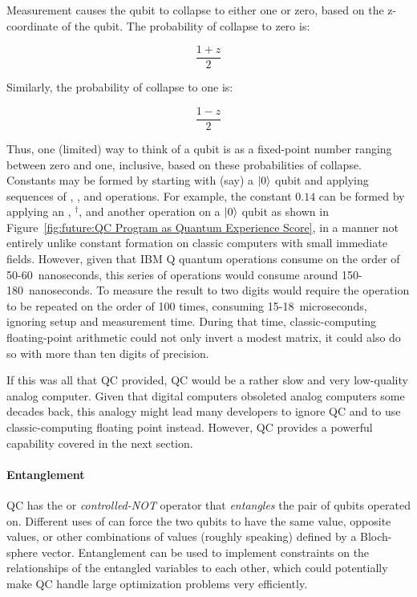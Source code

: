 Measurement causes the qubit to collapse to either one or zero, based
on the z-coordinate of the qubit.
The probability of collapse to zero is:

\begin{equation}
	\frac{1+z}{2}
\end{equation}

Similarly, the probability of collapse to one is:

\begin{equation}
	\frac{1-z}{2}
\end{equation}

Thus, one (limited) way to think of a qubit is as a fixed-point number
ranging between zero and one, inclusive, based on these probabilities
of collapse.
Constants may be formed by starting with (say) a $\ket{0}$ qubit and
applying sequences of , , and  operations.
For example, the constant $0.14$ can be formed by applying an
, $^\dagger$, and another 
operation on a $\ket{0}$ qubit as shown in
Figure~\ref{fig:future:QC Program as Quantum Experience Score},
in a manner not entirely unlike constant formation on classic
computers with small immediate fields.
However, given that IBM Q quantum operations consume on the
order of 50-60~nanoseconds, this series of operations would
consume around 150-180~nanoseconds.
To measure the result to two digits would require the operation to
be repeated on the order of 100 times, consuming 15-18~microseconds,
ignoring setup and measurement time.
During that time, classic-computing floating-point arithmetic could not
only invert a modest matrix, it could also do so with more than
ten digits of precision.

If this was all that QC provided, QC would be a rather slow and very
low-quality analog computer.
Given that digital computers obsoleted analog computers some decades back,
this analogy might lead many developers to ignore QC and to
use classic-computing floating point instead.
However, QC provides a powerful capability covered in the next section.

\paragraph{Entanglement}

QC has the  or \emph{controlled-NOT} operator that
\emph{entangles} the pair of qubits operated on.
Different uses of  can force the two qubits to have the same
value, opposite values, or other combinations of values (roughly speaking)
defined by a Bloch-sphere vector.
Entanglement can be used to implement constraints
on the relationships of the entangled variables to each other, which
could potentially make QC handle large optimization problems very
efficiently.

